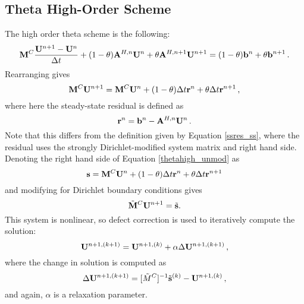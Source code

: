 \subsection{Theta High-Order Scheme}
The high order theta scheme is the following:
\begin{equation}
   \mathbf{M}^C\frac{\mathbf{U}^{n+1}-\mathbf{U}^n}{\Delta t} + (1-\theta)\mathbf{A}^{H,n}\mathbf{U}^n
   + \theta\mathbf{A}^{H,n+1}\mathbf{U}^{n+1} = (1-\theta)\mathbf{b}^n + \theta\mathbf{b}^{n+1} \,.
\end{equation}
Rearranging gives
\begin{equation}\label{thetahigh_unmod}
   \mathbf{M}^C\mathbf{U}^{n+1} = \mathbf{M}^C\mathbf{U}^n + (1-\theta)\Delta t\mathbf{r}^n + \theta\Delta t\mathbf{r}^{n+1} \,,
\end{equation}
where here the steady-state residual is defined as
\begin{equation}
   \mathbf{r}^n = \mathbf{b}^n - \mathbf{A}^{H,n}\mathbf{U}^n \,.
\end{equation}
Note that this differs from the definition given by Equation \eqref{ssres_ss},
where the residual uses the strongly Dirichlet-modified system matrix and right
hand side. Denoting the right hand side of Equation \eqref{thetahigh_unmod} as
\begin{equation}
   \mathbf{s} = \mathbf{M}^C\mathbf{U}^n + (1-\theta)\Delta t\mathbf{r}^n + \theta\Delta t\mathbf{r}^{n+1}
\end{equation}
and modifying for Dirichlet boundary conditions gives
\begin{equation}
   \tilde{\mathbf{M}}^C\mathbf{U}^{n+1} = \tilde{\mathbf{s}}.
\end{equation}
This system is nonlinear, so defect correction is used to iteratively
compute the solution:
\begin{equation}
   \mathbf{U}^{n+1,(k+1)} = \mathbf{U}^{n+1,(k)} + \alpha\Delta\mathbf{U}^{n+1,(k+1)} \,,
\end{equation}
where the change in solution is computed as
\begin{equation}
   \Delta\mathbf{U}^{n+1,(k+1)} = [\tilde{M}^C]^{-1}\tilde{\mathbf{s}}^{(k)} - \mathbf{U}^{n+1,(k)} \,,
\end{equation}
and again, $\alpha$ is a relaxation parameter.

